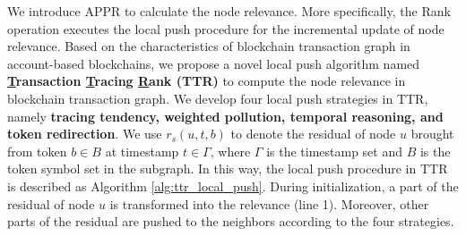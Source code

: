 We introduce APPR to calculate the node relevance. 
More specifically, the Rank operation executes the local push procedure for the incremental update of node relevance.
Based on the characteristics of blockchain transaction graph in account-based blockchains, we propose a novel local push algorithm named \textbf{\underline{T}ransaction \underline{T}racing \underline{R}ank (TTR)} to compute the node relevance in blockchain transaction graph. We develop four local push strategies in TTR, namely \textbf{tracing tendency, weighted pollution, temporal reasoning, and token redirection}. We use $r_s(u,t,b)$ to denote the residual of node $u$ brought from token $b \in B$ at timestamp $t \in \Gamma$, where $\Gamma$ is the timestamp set and $B$ is the token symbol set in the subgraph.
In this way, the local push procedure in TTR is described as Algorithm \ref{alg:ttr_local_push}. During initialization, a part of the residual of node $u$ is transformed into the relevance (line 1). Moreover, other parts of the residual are pushed to the neighbors according to the four strategies.
